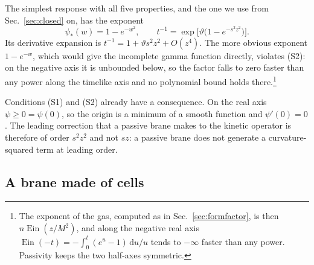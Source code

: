 \documentclass[a4paper,11pt]{article}
\newcommand{\dd}{\mathrm{d}}
\newcommand{\Ein}{\operatorname{Ein}}
\begin{document}
The simplest response with all five properties, and the one we use from Sec.~\ref{sec:closed} on, has the exponent
\begin{equation}
\label{eq:phistar}
\psi_*(w)=1-e^{-w^2},\qquad t^{-1}=\exp\bigl[\vartheta\bigl(1-e^{-s^2z^2}\bigr)\bigr].
\end{equation}
Its derivative expansion is $t^{-1}=1+\vartheta s^2z^2+O(z^4)$. The more obvious exponent $1-e^{-w}$, which would give the incomplete gamma function directly, violates (S2): on the negative axis it is unbounded below, so the factor falls to zero faster than any power along the timelike axis and no polynomial bound holds there.\footnote{The exponent of the gas, computed as in Sec.~\ref{sec:formfactor}, is then $n\Ein(z/M^2)$, and along the negative real axis $\Ein(-t)=-\int_0^t(e^{u}-1)\,\dd u/u$ tends to $-\infty$ faster than any power. Passivity keeps the two half-axes symmetric.}

Conditions (S1) and (S2) already have a consequence. On the real axis $\psi\ge0=\psi(0)$, so the origin is a minimum of a smooth function and $\psi'(0)=0$. The leading correction that a passive brane makes to the kinetic operator is therefore of order $s^2z^2$ and not $sz$: a passive brane does not generate a curvature-squared term at leading order.

\subsection{A brane made of cells}
\label{sec:cells}
\end{document}
